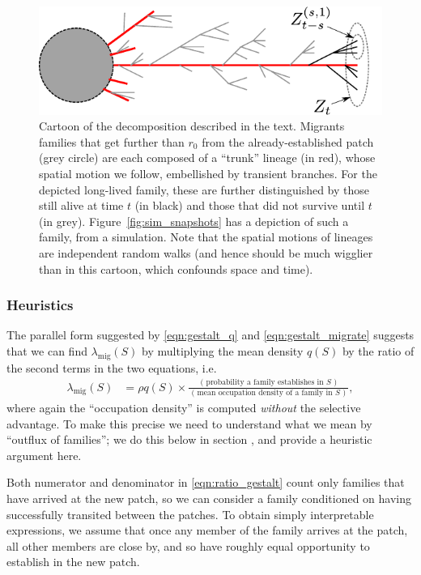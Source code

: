 \documentclass{article}
\newcommand{\migrate}{\lambda_\text{mig}}
\newcommand{\secref}[1]{{\emph{\nameref{#1}}}}
\begin{document}
\begin{figure}[ht!!]
  \begin{center}
    \includegraphics{branching-concept}
  \end{center}
\caption{Cartoon of the decomposition described in the text. 
Migrants families that get further than $r_0$ from the already-established patch (grey circle)
are each composed of a ``trunk'' lineage (in red), whose spatial motion we follow,
embellished by transient branches.
For the depicted long-lived family, these are further distinguished by those still alive at time $t$ (in black)
and those that did not survive until $t$ (in grey).
Figure~\ref{fig:sim_snapshots} has a depiction of such a family, from a simulation. 
Note that the spatial motions of lineages are independent random walks
(and hence should be much wigglier than in this cartoon, which confounds space and time).
} \label{fig:branching_decomp}
\end{figure}


\subsubsection{Heuristics}
\label{ss:heuristics}

The parallel form suggested by \eqref{eqn:gestalt_q} and \eqref{eqn:gestalt_migrate}
suggests that we can find $\migrate(S)$ by multiplying the mean density $q(S)$
by the ratio of the second terms in the two equations,
i.e.
\begin{align} \label{eqn:ratio_gestalt}
  \migrate(S) 
    &= \rho q(S) \times 
    \frac{
        \text{ ( probability a family establishes in $S$ ) }
    }{
        \text{ ( mean occupation density of a family in $S$ ) }
    } ,
\end{align}
where again the ``occupation density'' is computed \emph{without} the selective advantage.
To make this precise we need to understand what we mean by ``outflux of families'';
we do this below in section \secref{ss:hitting_occupation},
and provide a heuristic argument here.

Both numerator and denominator in \eqref{eqn:ratio_gestalt} 
count only families that have arrived at the new patch,
so we can consider a family conditioned on having successfully transited between the patches.
To obtain simply interpretable expressions,
we assume that once any member of the family arrives at the patch,
all other members are close by, and so have roughly equal opportunity
to establish in the new patch.
\end{document}
